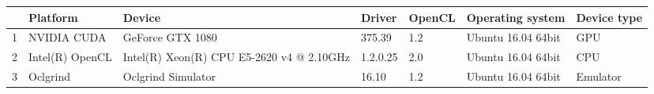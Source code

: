 \begin{tabular}{lllllll}
\toprule
{} &         Platform &                                     Device &    Driver & OpenCL &    Operating system & Device type \\
\midrule
1 &      NVIDIA CUDA &                           GeForce GTX 1080 &    375.39 &    1.2 &  Ubuntu 16.04 64bit &         GPU \\
2 &  Intel(R) OpenCL &  Intel(R) Xeon(R) CPU E5-2620 v4 @ 2.10GHz &  1.2.0.25 &    2.0 &  Ubuntu 16.04 64bit &         CPU \\
3 &         Oclgrind &                         Oclgrind Simulator &     16.10 &    1.2 &  Ubuntu 16.04 64bit &    Emulator \\
\bottomrule
\end{tabular}
